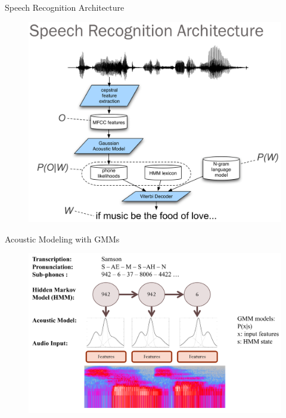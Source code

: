 \documentclass[10pt]{beamer}
\begin{document}
\begin{frame}[fragile]{Speech Recognition Architecture}
\begin{figure}
	\includegraphics[height=0.8\textheight]{./images/page-07.png}
\end{figure}
\end{frame}

\begin{frame}[fragile]{Acoustic Modeling with GMMs}
\begin{figure}
	\includegraphics[height=0.8\textheight]{./images/page-06.png}
\end{figure}
\end{frame}
\end{document}
